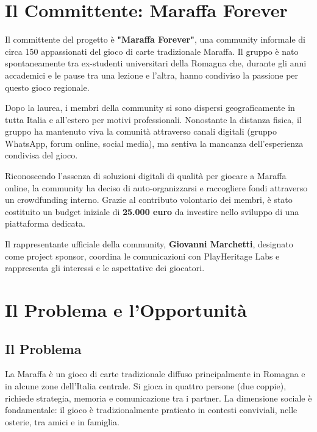 \section{Il Committente: Maraffa Forever}

Il committente del progetto è \textbf{"Maraffa Forever"}, una community informale di circa 150 appassionati del gioco di carte tradizionale Maraffa. Il gruppo è nato spontaneamente tra ex-studenti universitari della Romagna che, durante gli anni accademici e le pause tra una lezione e l'altra, hanno condiviso la passione per questo gioco regionale.

Dopo la laurea, i membri della community si sono dispersi geograficamente in tutta Italia e all'estero per motivi professionali. Nonostante la distanza fisica, il gruppo ha mantenuto viva la comunità attraverso canali digitali (gruppo WhatsApp, forum online, social media), ma sentiva la mancanza dell'esperienza condivisa del gioco.

Riconoscendo l'assenza di soluzioni digitali di qualità per giocare a Maraffa online, la community ha deciso di auto-organizzarsi e raccogliere fondi attraverso un crowdfunding interno. Grazie al contributo volontario dei membri, è stato costituito un budget iniziale di \textbf{25.000 euro} da investire nello sviluppo di una piattaforma dedicata.

Il rappresentante ufficiale della community, \textbf{Giovanni Marchetti}, designato come project sponsor, coordina le comunicazioni con PlayHeritage Labs e rappresenta gli interessi e le aspettative dei giocatori.

\section{Il Problema e l'Opportunità}

\subsection{Il Problema}

La Maraffa è un gioco di carte tradizionale diffuso principalmente in Romagna e in alcune zone dell'Italia centrale. Si gioca in quattro persone (due coppie), richiede strategia, memoria e comunicazione tra i partner. La dimensione sociale è fondamentale: il gioco è tradizionalmente praticato in contesti conviviali, nelle osterie, tra amici e in famiglia.

